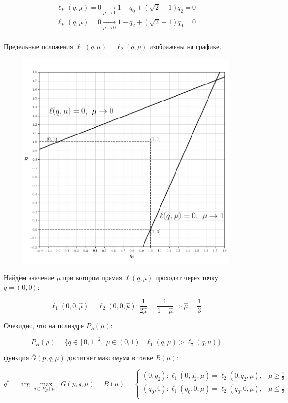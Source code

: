 \begin{flushleft}
	\begin{gather*}	
	\ell_B(q,\mu) =0\xrightarrow[\mu\rightarrow 1]{} 
	1-q_0+(\sqrt{2}-1)q_2=0\\	
	\ell_B(q,\mu)=0 \xrightarrow[\mu\rightarrow 0]{} 	
	1-q_2+(\sqrt{2}-1)q_0=0\\
	\end{gather*}
	
	Предельные положения $\ell_1(q, \mu)=\ell_2(q, \mu)$ изображены на графике.
	
	\begin{figure}[H]
		\centering
  		\includegraphics[scale=0.3]{images/graf_3_2}
  		\caption{}
	\end{figure}	
	
	Найдём значение $\mu$ при котором прямая $\ell(q, \mu)$ проходит через точку
	$q=(0,0)$:
	
	$$\ell_1(0,0,\hat \mu) = \ell_2(0,0,\hat \mu) :
	\frac{1}{2\hat \mu}=\frac{1}{1-\hat \mu} 
	\Rightarrow \hat \mu = \frac{1}{3}$$	
	
	Очевидно, что на полиэдре $P_B(\mu):$
		
	$$P_B(\mu)=\{q \in [0,1]^2, \; \mu \in (0,1) \; | 
	\;  \ell_1(q, \mu) > \ell_2(q, \mu) \}$$
	
	функция $\overline{G}(p,q,\mu)$ достигает максимума в точке $B(\mu):$
	
	$$
	q^* = \arg \max \limits_{q\in P_B(\mu)} \overline G(y,q,\mu) = B(\mu)=
	\begin{cases}
		(0, q_2) : \ell_1(0,q_2,\mu)=\ell_2(0,q_2,\mu), & \mu \geqslant \frac{1}{3} \\
		(q_0, 0) : \ell_1(q_0,0,\mu)=\ell_2(q_0,0,\mu), & \mu \leqslant \frac{1}{3} \\
	\end{cases}	
	$$
	

\end{flushleft}
